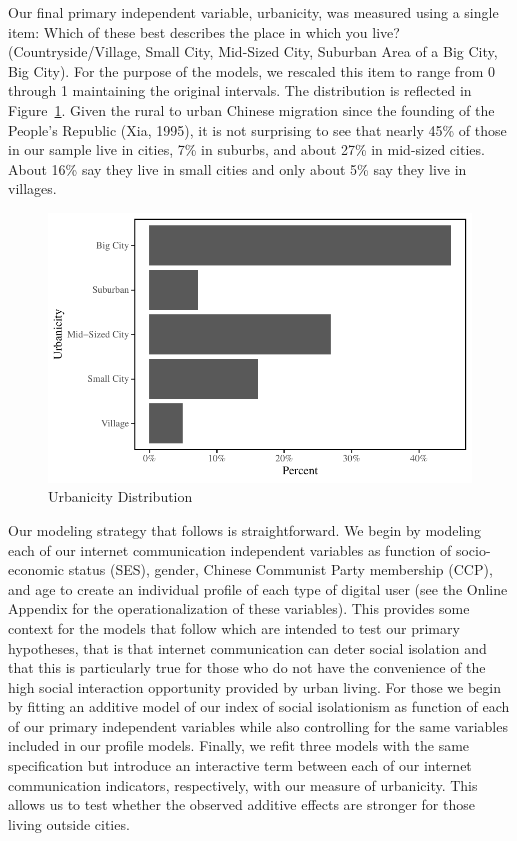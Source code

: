 \documentclass[]{interact}
\theoremstyle{plain}%
\theoremstyle{definition}
\theoremstyle{remark}
\begin{document}
Our final primary independent variable, urbanicity, was measured using a
single item: Which of these best describes the place in which you live?
(Countryside/Village, Small City, Mid-Sized City, Suburban Area of a Big
City, Big City). For the purpose of the models, we rescaled this item to
range from 0 through 1 maintaining the original intervals. The
distribution is reflected in Figure~\ref{fig-urban-dist}. Given the
rural to urban Chinese migration since the founding of the People's
Republic (Xia, 1995), it is not surprising to see that nearly 45\% of
those in our sample live in cities, 7\% in suburbs, and about 27\% in
mid-sized cities. About 16\% say they live in small cities and only
about 5\% say they live in villages.

\begin{figure}

{\centering \includegraphics{Social-Isolation-in-China_files/figure-pdf/fig-urban-dist-1.pdf}

}

\caption{\label{fig-urban-dist}Urbanicity Distribution}

\end{figure}

Our modeling strategy that follows is straightforward. We begin by
modeling each of our internet communication independent variables as
function of socio-economic status (SES), gender, Chinese Communist Party
membership (CCP), and age to create an individual profile of each type
of digital user (see the Online Appendix for the operationalization of
these variables). This provides some context for the models that follow
which are intended to test our primary hypotheses, that is that internet
communication can deter social isolation and that this is particularly
true for those who do not have the convenience of the high social
interaction opportunity provided by urban living. For those we begin by
fitting an additive model of our index of social isolationism as
function of each of our primary independent variables while also
controlling for the same variables included in our profile models.
Finally, we refit three models with the same specification but introduce
an interactive term between each of our internet communication
indicators, respectively, with our measure of urbanicity. This allows us
to test whether the observed additive effects are stronger for those
living outside cities.
\end{document}
